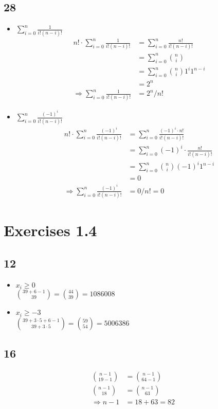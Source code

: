 \documentclass[a4paper]{article}
\begin{document}
\subsection{28}
    \begin{itemize}
      \item $\sum_{i=0}^n\frac{1}{i!(n-i)!}$
        \begin{align*}
            n!\cdot \sum_{i=0}^n\frac{1}{i!(n-i)!}  & = \sum_{i=0}^n\frac{n!}{i!(n-i)!} \\
            & = \sum_{i=0}^n\binom{n}{i} \\
            & = \sum_{i=0}^n\binom{n}{i}1^i1^{n-i} \\
            & = 2^n\\
            \Rightarrow\sum_{i=0}^n\frac{1}{i!(n-i)!}& = 2^n/n!
        \end{align*}
      \item $\sum_{i=0}^n\frac{(-1)^i}{i!(n-i)!}$
        \begin{align*}
            n!\cdot \sum_{i=0}^n\frac{(-1)^i}{i!(n-i)!}  & = \sum_{i=0}^n\frac{(-1)^i\cdot n!}{i!(n-i)!} \\
            & = \sum_{i=0}^n (-1)^i\cdot\frac{n!}{i!(n-i)!} \\
            & = \sum_{i=0}^n\binom{n}{i}(-1)^i1^{n-i} \\
            & = 0\\
            \Rightarrow\sum_{i=0}^n\frac{(-1)^i}{i!(n-i)!}& = 0/n!=0
        \end{align*}
    \end{itemize}

\section{Exercises 1.4}
\subsection{12}
    \begin{itemize}
      \item $x_i \ge 0 $\\
      $\binom{39+6-1}{39}=\binom{44}{39}=1086008 $
      \item $x_i \ge -3 $\\
      $\binom{39+3\cdot5+6-1}{39+3\cdot5}=\binom{59}{54}=5006386 $
    \end{itemize}

\subsection{16}
    \begin{align*}
        \binom{n-1}{19-1} & = \binom{n-1}{64-1} \\
        \binom{n-1}{18} & = \binom{n-1}{63} \\
        \Rightarrow n-1 & = 18+63=82
    \end{align*}
    
\end{document}
